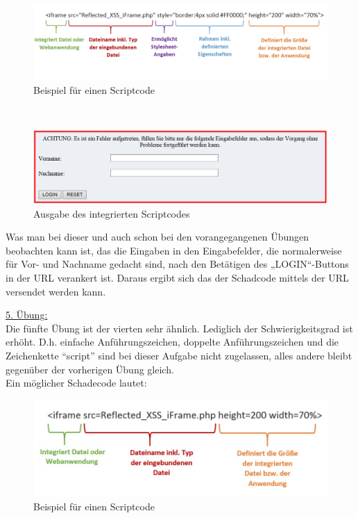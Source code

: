 \begin{figure}[h]
	\centering
	\includegraphics[width=\textwidth]{images/XSS/ScriptcodeIV.jpg}
	\caption{Beispiel für einen Scriptcode}
	\label{fig:xss-reflected-ScriptcodeIV}
\end{figure}

\ \\

\begin{figure}[h]
	\centering
	\includegraphics[width=\textwidth]{images/XSS/fremdes_anmeldeformular.jpg}
	\caption{Ausgabe des integrierten Scriptcodes}
	\label{fig:xss-reflected-ScriptcodeIV.1}
\end{figure}

Was man bei dieser und auch schon bei den vorangegangenen Übungen beobachten kann ist, das die Eingaben in den Eingabefelder, die normalerweise für Vor- und Nachname gedacht sind, nach den Betätigen des „LOGIN“-Buttons in der URL verankert ist. Daraus ergibt sich das der Schadcode mittels der URL versendet werden kann.

\newpage

\underline{5. Übung:}
\\
Die fünfte Übung ist der vierten sehr ähnlich. Lediglich der Schwierigkeitsgrad ist erhöht. 
D.h. einfache Anführungszeichen, doppelte Anführungszeichen und die Zeichenkette "`script"' sind bei dieser Aufgabe nicht zugelassen, alles andere bleibt gegenüber der vorherigen Übung gleich.
\\
Ein möglicher Schadecode lautet:

\begin{figure}[h]
	\centering
	\includegraphics[width=\textwidth]{images/XSS/ScriptcodeV.jpg}
	\caption{Beispiel für einen Scriptcode}
	\label{fig:xss-reflected-ScriptcodeV}
\end{figure}

